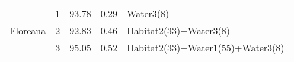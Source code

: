 \begin{table}
\begin{tabular}{|c|c|c|c|l|}
\hline
\multirow{3}{*}{Floreana}                                               & 1        & 93.78  & 0.29 & Water3(8)                                                          \\ 
\cline{2-5}
                                                                        & 2        & 92.83  & 0.46 & Habitat2(33)+Water3(8)                                             \\ 
\cline{2-5}
                                                                        & 3        & 95.05  & 0.52 & Habitat2(33)+Water1(55)+Water3(8)                                  \\
\hline
\end{tabular}
\end{table}